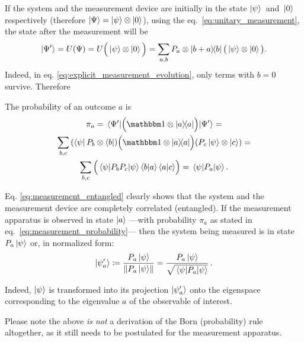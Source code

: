 If the system and the measurement device are initially in the
state $\ket{\psi}$~and~$\ket{0}$ respectively
(therefore $\ket{\Psi} = \ket{\psi} \otimes \ket{0}$),
using the eq.~\eqref{eq:unitary_measurement},
the state after the measurement will be %
%
\begin{equation}\label{eq:explicit_measurement_evolution}
  \ket{\Psi^{\prime}} = U(\Psi) = U\Big(\ket{\psi} \otimes \ket{0}\Big) =
    \sum_{a, b} P_a \otimes \ketbra{b+a}{b} \big(\ket{\psi} \otimes \ket{0}\big)
    \text{.}
\end{equation}
Indeed, in eq. \eqref{eq:explicit_measurement_evolution}, only terms with $b=0$ survive.
Therefore

The probability of an outcome $a$ is
\begin{multline}\label{eq:measurement_probability}
  \pi_{a} = \expval{\qty\Big(\idop\ox\ketbra{a})}{\Psi^{\prime}} = \\
    \sum_{b,c}
      \qty(\bra{\psi}P_{b}\ox\bra{b})
      \qty\Big(\idop\ox\ketbra{a})
      \qty(P_{c}\ket{\psi}\ox\ket{c}) = \\
    \sum_{b,c}\qty\Big(\expval{P_bP_c}{\psi} \braket{b}{a} \braket{a}{c}) =
    \expval{P_a}{\psi} \text{.}
\end{multline}

Eq. \eqref{eq:measurement_entangled} clearly shows that the system
and the measurement device are completely correlated (entangled).
If the measurement apparatus is observed in state $\ket{a}$
---with probability $\pi_{a}$ as stated in eq.~\eqref{eq:measurement_probability}---
then the system being measured is in state $P_{a}\ket{\psi}$
or, in normalized form:
\begin{equation}\label{eq:normalized_collapse}
  \ket{\psi^\prime_a} \coloneqq \frac{P_{a}\ket{\psi}}{\norm{P_{a}\ket{\psi}}}
    = \frac{P_{a}\ket{\psi}}{\sqrt{\expval{P_a}{\psi}}} \,\text{.}
\end{equation}

Indeed,
$\ket{\psi}$
is transformed
into its projection $\ket{\psi^\prime_a}$
onto the eigenspace
corresponding to the eigenvalue $a$ of the observable of interest.

Please note the above \emph{is not} a derivation of the Born (probability) rule altogether,
as it still needs to be postulated for the measurement apparatus.

